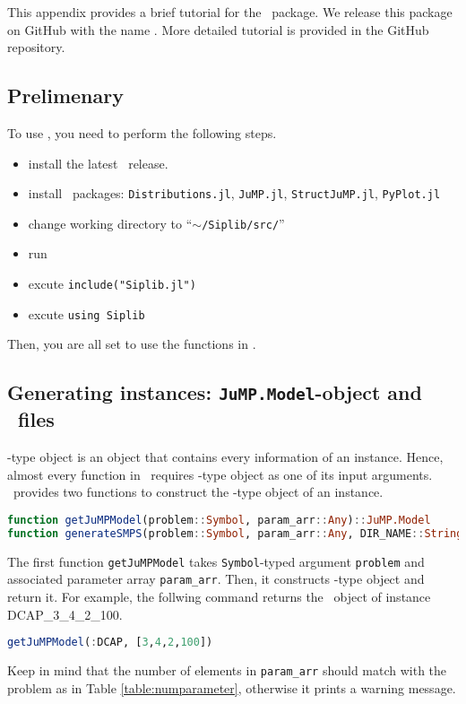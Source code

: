 This appendix provides a brief tutorial for the \julia\ package. We release this package on GitHub with the name \siplibjl. More detailed tutorial is provided in the GitHub repository.

\subsection{Prelimenary}
To use \siplibjl, you need to perform the following steps.
\begin{itemize}
	\item install the latest \julia\ release.
	\item install \julia\ packages: \texttt{Distributions.jl}, \texttt{JuMP.jl}, \texttt{StructJuMP.jl}, \texttt{PyPlot.jl}
	\item change working directory to ``\texttt{$\sim$/Siplib/src/}''
	\item run \julia\
	\item excute \texttt{include("Siplib.jl")}
	\item excute \texttt{using Siplib}
\end{itemize}
Then, you are all set to use the functions in \siplibjl.

\subsection{Generating instances: \texttt{JuMP.Model}-object and \smps\ files}
\jumpmodel-type object is an object that contains every information of an instance. Hence, almost every function in \siplibjl\ requires \jumpmodel-type object as one of its input arguments. \siplibjl\ provides two functions to construct the \jumpmodel-type object of an instance.
\begin{lstlisting}[frame=single,language=julia]
function getJuMPModel(problem::Symbol, param_arr::Any)::JuMP.Model
function generateSMPS(problem::Symbol, param_arr::Any, DIR_NAME::String="$(dirname(@__FILE__))/../instance")::JuMP.Model
\end{lstlisting}

The first function \texttt{getJuMPModel} takes \texttt{Symbol}-typed argument \texttt{problem} and associated parameter array \texttt{param\_arr}. Then, it constructs \jumpmodel-type object and return it. For example, the follwing command returns the \jumpmodel\ object of instance DCAP\_3\_4\_2\_100.
\begin{lstlisting}[frame=single,language=julia]
getJuMPModel(:DCAP, [3,4,2,100])
\end{lstlisting}
Keep in mind that the number of elements in \texttt{param\_arr} should match with the problem as in Table \ref{table:numparameter}, otherwise it prints a warning message.

